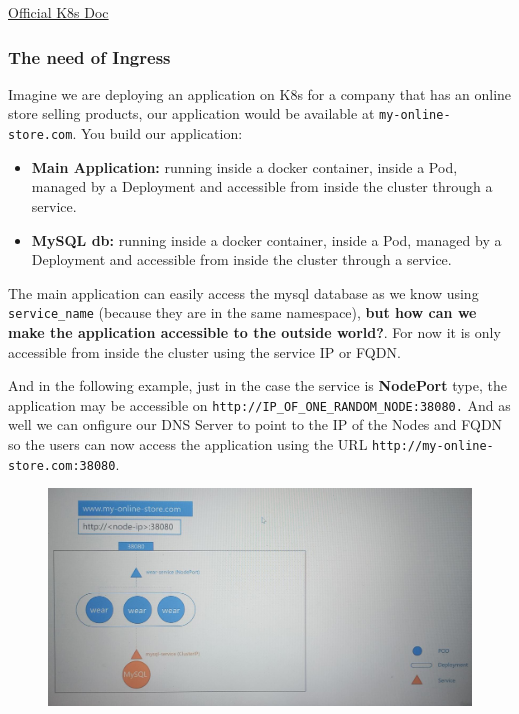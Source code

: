 \documentclass{article}
\begin{document}
\href{https://kubernetes.io/docs/concepts/services-networking/ingress/}{Official K8s Doc}

\subsubsection{The need of Ingress}

Imagine we are deploying an application on K8s for a company that has an online store selling products, our application would be available at \verb|my-online-store.com|. 
You build our application:
\begin{itemize}
    \item \textbf{Main Application:} running inside a docker container, inside a Pod, managed by a Deployment and accessible from inside the cluster through a service.
    \item \textbf{MySQL db:} running inside a docker container, inside a Pod, managed by a Deployment and accessible from inside the cluster through a service.
\end{itemize}

The main application can easily access the mysql database as we know using \verb|service_name| (because they are in the same namespace), 
\textbf{but how can we make the application accessible to the outside world?}. For now it is only accessible from inside the cluster using the service IP or FQDN.

And in the following example, just in the case the service is \textbf{NodePort} type, the application may be
accessible on \verb|http://IP_OF_ONE_RANDOM_NODE:38080.| And as well we can onfigure our DNS Server to point to the IP of the Nodes and FQDN so the users can now access the application using the URL \verb+http://my-online-store.com:38080+.

\begin{figure}[H]
    \centering
    \includegraphics[width=\textwidth]{pictures/ingress4.png}
\end{figure}
\end{document}
